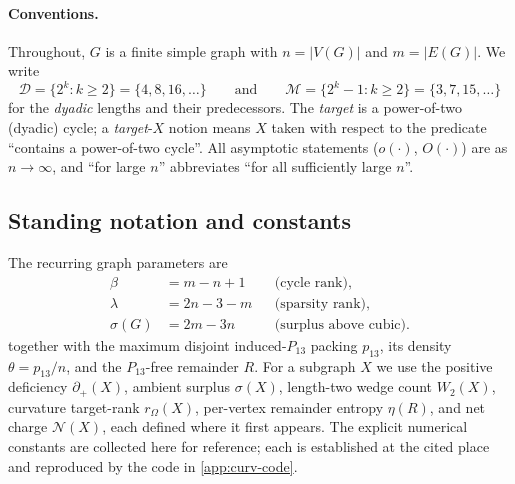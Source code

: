 \documentclass[11pt]{article}
\newcommand{\Mers}{\mathcal M}
\newcommand{\Pow}{\mathcal D}
\newcommand{\defp}{\partial_+}
\newcommand{\No}{\mathcal N}
\begin{document}
\paragraph{Conventions.}
Throughout, $G$ is a finite simple graph with $n=|V(G)|$ and $m=|E(G)|$.  We write
\[
\Pow=\{2^{k}:k\ge2\}=\{4,8,16,\dots\}
\qquad\text{and}\qquad
\Mers=\{2^{k}-1:k\ge2\}=\{3,7,15,\dots\}
\]
for the \emph{dyadic} lengths and their predecessors.  The \emph{target} is a power-of-two (dyadic) cycle; a \emph{target}-$X$ notion means $X$ taken with respect to the predicate ``contains a power-of-two cycle''.  All asymptotic statements ($o(\cdot)$, $O(\cdot)$) are as $n\to\infty$, and ``for large $n$'' abbreviates ``for all sufficiently large $n$''.

\subsection*{Standing notation and constants}

The recurring graph parameters are
\[
\begin{aligned}
\beta&=m-n+1 &&\text{(cycle rank)},\\
\lambda&=2n-3-m &&\text{(sparsity rank)},\\
\sigma(G)&=2m-3n &&\text{(surplus above cubic)} .
\end{aligned}
\]
together with the maximum disjoint induced-$P_{13}$ packing $p_{13}$, its density $\theta=p_{13}/n$, and the $P_{13}$-free remainder $R$.  For a subgraph $X$ we use the positive deficiency $\defp(X)$, ambient surplus $\sigma(X)$, length-two wedge count $W_2(X)$, curvature target-rank $r_\Omega(X)$, per-vertex remainder entropy $\eta(R)$, and net charge $\No(X)$, each defined where it first appears.  The explicit numerical constants are collected here for reference; each is established at the cited place and reproduced by the code in \cref{app:curv-code}.
\end{document}
